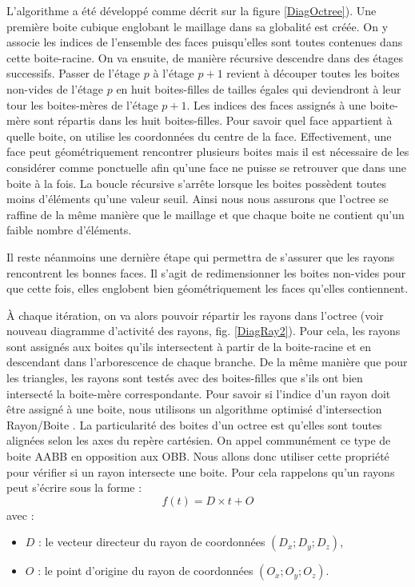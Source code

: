 L'algorithme a été développé comme décrit sur la figure \ref{DiagOctree}). Une première boite cubique englobant le maillage dans sa globalité est créée. On y associe les indices de l'ensemble des faces puisqu'elles sont toutes contenues dans cette boite-racine. On va ensuite, de manière récursive descendre dans des étages successifs. Passer de l'étage $p$ à l'étage $p+1$ revient à découper toutes les boites non-vides de l'étage $p$ en huit boites-filles de tailles égales qui deviendront à leur tour les boites-mères de l'étage $p+1$. Les indices des faces assignés à une boite-mère sont répartis dans les huit boites-filles. Pour savoir quel face appartient à quelle boite, on utilise les coordonnées du centre de la face. Effectivement, une face peut géométriquement rencontrer plusieurs boites mais il est nécessaire de les considérer comme ponctuelle afin qu'une face ne puisse se retrouver que dans une boite à la fois. La boucle récursive s'arrête lorsque les boites possèdent toutes moins d'éléments qu'une valeur seuil. Ainsi nous nous assurons que l'\gls{octree} se raffine de la même manière que le maillage et que chaque boite ne contient qu'un faible nombre d'éléments.


Il reste néanmoins une dernière étape qui permettra de s'assurer que les rayons rencontrent les bonnes faces. Il s'agit de redimensionner les boites non-vides pour que cette fois, elles englobent bien géométriquement les faces qu'elles contiennent.


À chaque itération, on va alors pouvoir répartir les rayons dans l'\gls{octree} (voir nouveau diagramme d'activité des rayons, fig. \ref{DiagRay2}). Pour cela, les rayons sont assignés aux boites qu'ils intersectent à partir de la boite-racine et en descendant dans l'arborescence de chaque branche. De la même manière que pour les triangles, les rayons sont testés avec des boites-filles que s'ils ont bien intersecté la boite-mère correspondante. Pour savoir si l'indice d'un rayon doit être assigné à une boite, nous utilisons un algorithme optimisé d'intersection Rayon/Boite \cite{AABB}. La particularité des boites d'un \gls{octree} est qu'elles sont toutes alignées selon les axes du repère cartésien. On appel communément ce type de boite \gls{AABB} en opposition aux \gls{OBB}. Nous allons donc utiliser cette propriété pour vérifier si un rayon intersecte une boite. Pour cela rappelons qu'un rayons peut s'écrire sous la forme : 
\begin{equation}
f(t) = D \times t + O
\end{equation}
avec :
\begin{itemize}
\item $D$ : le vecteur directeur du rayon de coordonnées $(D_x ; D_y ; D_z)$,
\item $O$ : le point d'origine du rayon de coordonnées $(O_x ; O_y ; O_z)$.
\end{itemize}

